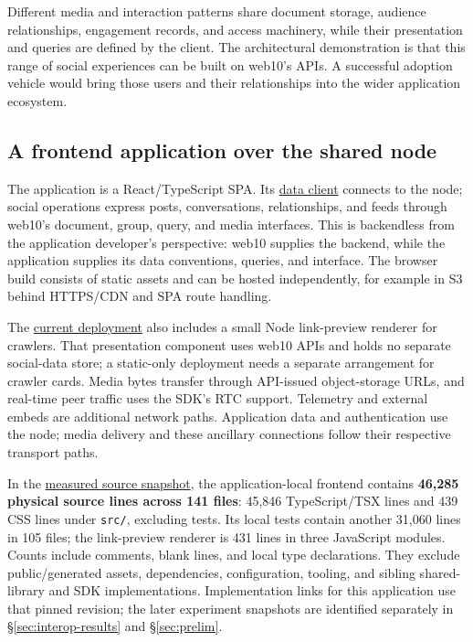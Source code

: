 \documentclass[sigconf, nonacm]{acmart}
\newcommand{\artifactbase}{https://github.com/jacoby149/web10}
\newcommand{\artifactrev}{317fa349eae714ddde07f249ca65cdaa34b6459b}
\newcommand{\artifactdir}[2]{\href{\artifactbase/tree/\artifactrev/#1}{#2}}
\newcommand{\artifactfile}[2]{\href{\artifactbase/blob/\artifactrev/#1}{#2}}
\begin{document}
Different media and interaction patterns share document storage, audience relationships,
engagement records, and access machinery, while their presentation and queries
are defined by the client. The architectural demonstration is that this range
of social experiences can be built on web10's APIs. A successful adoption
vehicle would bring those users and their relationships into the wider
application ecosystem.

\subsection{A frontend application over the shared node}

The application is a React/TypeScript SPA. Its
\artifactfile{marketing/web10-social/src/data/v3.ts}{data client} connects to
the node; social operations express posts, conversations, relationships, and
feeds through web10's document, group, query, and media interfaces. This is
backendless from the application developer's perspective: web10 supplies the
backend, while the application supplies its data conventions, queries, and
interface. The browser build consists of static assets and can be hosted
independently, for example in S3 behind HTTPS/CDN and SPA route handling.

The \artifactfile{marketing/web10-social/Dockerfile}{current deployment} also
includes a small Node link-preview renderer for crawlers. That presentation
component uses web10 APIs and holds no separate social-data store; a static-only
deployment needs a separate arrangement for crawler cards. Media bytes transfer
through API-issued object-storage URLs, and real-time peer traffic uses the
SDK's RTC support. Telemetry and external embeds are additional network paths.
Application data and authentication use the node; media delivery and these
ancillary connections follow their respective transport paths.

In the \artifactdir{marketing/web10-social/src}{measured source snapshot}, the application-local frontend contains
\textbf{46,285 physical source lines across 141 files}: 45,846 TypeScript/TSX
lines and 439 CSS lines under \texttt{src/}, excluding tests. Its local tests
contain another 31,060 lines in 105 files; the link-preview renderer is 431 lines
in three JavaScript modules. Counts include comments, blank lines, and local
type declarations. They exclude public/generated assets, dependencies,
configuration, tooling, and sibling shared-library and SDK implementations.
Implementation links for this application use that pinned revision;
the later experiment snapshots are identified separately in
\S\ref{sec:interop-results} and \S\ref{sec:prelim}.
\end{document}
